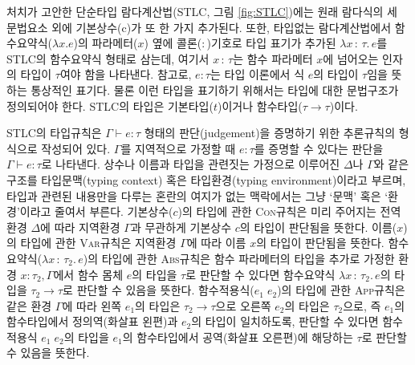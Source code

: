     처치가 고안한 단순타입 람다계산법(STLC, 그림 \ref{fig:STLC})에는 원래
람다식의 세 문법요소 외에 기본상수(c)가 또 한 가지 추가된다. 또한,
타입없는 람다계산법에서 함수요약식(\(\lambda x.e\))의 파라메터(\(x\))
옆에 콜론(\(:\))기호로 타입 표기가 추가된 \(\lambda x{\,:\,}\tau.\,e\)를
STLC의 함수요약식 형태로 삼는데, 여기서 \(x{\,:\,}\tau\)는 함수 파라메터
\(x\)에 넘어오는 인자의 타입이 \(\tau\)여야 함을 나타낸다. 참고로,
\(e:\tau\)는 타입 이론에서 식 \(e\)의 타입이 \(\tau\)임을 뜻하는
통상적인 표기다. 물론 이런 타입을 표기하기 위해서는 타입에 대한
문법구조가 정의되어야 한다. STLC의 타입은 기본타입(\(t\))이거나
함수타입(\(\tau\to\tau\))이다.

STLC의 타입규칙은 \(\Gamma \vdash e:\tau\) 형태의 판단(judgement)을
증명하기 위한 추론규칙의 형식으로 작성되어 있다. \(\Gamma\)를 지역적으로
가정할 때 \(e:\tau\)를 증명할 수 있다는 판단을
\(\Gamma \vdash e:\tau\)로 나타낸다. 상수나 이름과 타입을 관련짓는
가정으로 이루어진 \(\Delta\)나 \(\Gamma\)와 같은 구조를 타입문맥(typing
context) 혹은 타입환경(typing environment)이라고 부르며, 타입과 관련된
내용만을 다루는 혼란의 여지가 없는 맥락에서는 그냥 `문맥' 혹은
`환경'이라고 줄여서 부른다. 기본상수(\(c\))의 타입에 관한
\textsc{\small Con}규칙은 미리 주어지는 전역환경 \(\Delta\)에 따라
지역환경 \(\Gamma\)과 무관하게 기본상수 \(c\)의 타입이 판단됨을 뜻한다.
이름(\(x\))의 타입에 관한 \textsc{\small Var}규칙은 지역환경
\(\Gamma\)에 따라 이름 \(x\)의 타입이 판단됨을 뜻한다.
함수요약식(\(\lambda x{\,:\,}\tau_2.\,e\))의 타입에 관한
\textsc{\small Abs}규칙은 함수 파라메터의 타입을 추가로 가정한 환경
\(x:\tau_2,\Gamma\)에서 함수 몸체 \(e\)의 타입을 \(\tau\)로 판단할 수
있다면 함수요약식 \(\lambda x{\,:\,}\tau_2.\,e\)의 타입을
\(\tau_2\to\tau\)로 판단할 수 있음을 뜻한다. 함수적용식(\(e_1\;e_2\))의
타입에 관한 \textsc{\small App}규칙은 같은 환경 \(\Gamma\)에 따라 왼쪽
\(e_1\)의 타입은 \(\tau_2\to\tau\)으로 오른쪽 \(e_2\)의 타입은
\(\tau_2\)으로, 즉 \(e_1\)의 함수타입에서 정의역(화살표 왼편)과
\(e_2\)의 타입이 일치하도록, 판단할 수 있다면 함수적용식 \(e_1\;e_2\)의
타입을 \(e_1\)의 함수타입에서 공역(화살표 오른편)에 해당하는 \(\tau\)로
판단할 수 있음을 뜻한다.

